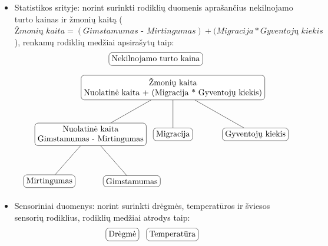 \documentclass{VUMIFPSbakalaurinis}
\begin{document}
\begin{itemize}
    \item Statistikos srityje: norint surinkti rodiklių duomenis aprašančius nekilnojamo turto kainas ir žmonių kaitą (\(\textit{Žmonių kaita} = (\textit{Gimstamumas - Mirtingumas}) + (\textit{Migracija} * \textit{Gyventojų kiekis}\)), renkamų rodiklių medžiai apsirašytų taip: 
    \[	
        \begin{tikzpicture}[sibling distance=7em, every node/.style = {shape=rectangle, rounded                                corners, draw, align=center,	
            top color=white, bottom color=white}]	
            \node{Nekilnojamo turto kaina};
        \end{tikzpicture} 
    \]
    \[
        \begin{tikzpicture}[sibling distance=10em,
            level distance=2cm,
            every node/.style = {shape=rectangle, rounded corners,	
                                 draw, align=center,	
                                 top color=white, bottom color=white}]	
            \node{Žmonių kaita\\Nuolatinė kaita + (Migracija * Gyventojų kiekis)}
                    child { node {Nuolatinė kaita\\Gimstamumas - Mirtingumas} 
                            child {node {Mirtingumas}}
                            child {node {Gimstamumas}} }	
                    child { node {Migracija} } 	
                    child { node {Gyventojų kiekis} }; 	
        \end{tikzpicture} 	
    \]
    \item Sensoriniai duomenys: norint surinkti drėgmės, temperatūros ir šviesos sensorių rodiklius, rodiklių medžiai atrodys taip:
    \[	
        \begin{tikzpicture}[sibling distance=7em,  every node/.style = {shape=rectangle,  
                                rounded corners, draw, align=center,	
                                top color=white, bottom color=white}]	
            \node{Drėgmė};
        \end{tikzpicture}\>\>\>\>
        \begin{tikzpicture}[sibling distance=7em, every node/.style = {shape=rectangle, 
                                rounded corners, draw, align=center,	
                                top color=white, bottom color=white}]	
            \node{Temperatūra};
        \end{tikzpicture}\>\>\>\>
        \begin{tikzpicture}[sibling distance=7em, every node/.style = {shape=rectangle, rounded                                corners, draw, align=center,	
                                top color=white, bottom color=white}]	

\end{tikzpicture}\]
\end{itemize}
\end{document}
